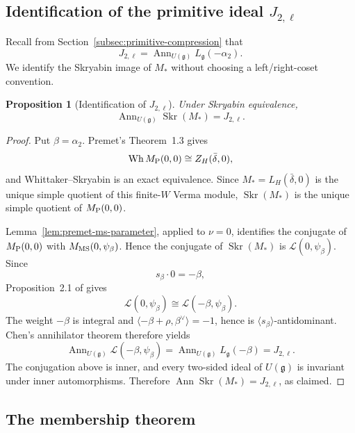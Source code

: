 \documentclass[11pt]{amsart}
\newtheorem{proposition}[theorem]{Proposition}
\theoremstyle{remark}
\numberwithin{equation}{section}
\begin{document}
\subsection{Identification of the primitive ideal $J_{2,\ell}$}

Recall from Section~\ref{subsec:primitive-compression} that
\[
   J_{2,\ell}
   =
   \operatorname{Ann}_{U(\mathfrak g)}
   L_{\mathfrak g}(-\alpha_2).
\]
We identify the Skryabin image of $M_*$ without choosing a
left/right-coset convention.

\begin{proposition}[Identification of $J_{2,\ell}$]
\label{prop:node2-identification}
Under Skryabin equivalence,
\begin{equation}
   \operatorname{Ann}_{U(\mathfrak g)}
   \operatorname{Skr}(M_*)
   =
   J_{2,\ell}.
\end{equation}
\end{proposition}

\begin{proof}
Put \(\beta=\alpha_2\).  Premet's Theorem~1.3 gives
\[
   \operatorname{Wh}M_{\rm P}(0,0)
   \cong Z_H(\bar\delta,0),
\]
and Whittaker--Skryabin is an exact equivalence.  Since
\(M_*=L_H(\bar\delta,0)\) is the unique simple quotient of this
finite-\(W\) Verma module, \(\operatorname{Skr}(M_*)\) is the unique
simple quotient of \(M_{\rm P}(0,0)\).

Lemma~\ref{lem:premet-ms-parameter}, applied to \(\nu=0\), identifies the
conjugate of \(M_{\rm P}(0,0)\) with
\(M_{\rm MS}(0,\psi_\beta)\).  Hence the conjugate of
\(\operatorname{Skr}(M_*)\) is
\(\mathcal L(0,\psi_\beta)\).  Since
\[
   s_\beta\mathbin\cdot0=-\beta,
\]
Proposition~2.1 of \cite{MilicicSoergel1997} gives
\[
   \mathcal L(0,\psi_\beta)
   \cong
   \mathcal L(-\beta,\psi_\beta).
\]
The weight \(-\beta\) is integral and
\(\langle-\beta+\rho,\beta^\vee\rangle=-1\), hence is
\(\langle s_\beta\rangle\)-antidominant.  Chen's annihilator theorem
\cite[Theorem~B]{Chen2021Annihilator} therefore yields
\[
   \operatorname{Ann}_{U(\mathfrak g)}
   \mathcal L(-\beta,\psi_\beta)
   =
   \operatorname{Ann}_{U(\mathfrak g)}L_{\mathfrak g}(-\beta)
   =J_{2,\ell}.
\]
The conjugation above is inner, and every two-sided ideal of
\(U(\mathfrak g)\) is invariant under inner automorphisms.  Therefore
\(\operatorname{Ann}\operatorname{Skr}(M_*)=J_{2,\ell}\), as claimed.
\end{proof}

\subsection{The membership theorem}
\end{document}
